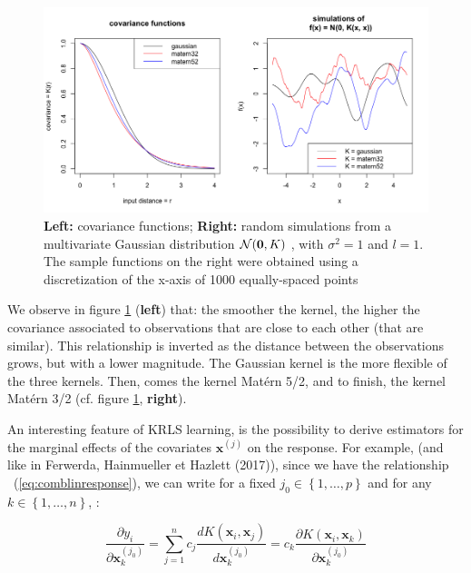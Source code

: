 \begin{figure}[!htb]
\centering
\includegraphics[width=14cm]{gfx/chapter-krls-models/covariance_functions.png}
\caption{\textbf{Left:} covariance functions; \textbf{Right:} random simulations from a multivariate Gaussian distribution $\mathcal{N}(\textbf{0}, K)$ , with $\sigma^2 = 1$ and $l = 1$. The sample functions on the right were obtained using a discretization of the x-axis of 1000 equally-spaced points}
\label{cov_functions}
\end{figure}

We observe in figure \ref{cov_functions} (\textbf{left}) that: the smoother the kernel, the higher the covariance associated to observations that are close to each other (that are similar). This relationship is inverted as the distance between the observations grows, but with a lower magnitude. The Gaussian kernel is the more flexible of the three kernels. Then, comes the kernel Mat\'ern 5/2, and to finish, the kernel Mat\'ern 3/2 (cf. figure \ref{cov_functions}, \textbf{right}).

An interesting feature of KRLS learning, is the possibility to derive estimators for the  marginal effects of the covariates $\textbf{x}^{(j)}$ on the response. For example, (and like in Ferwerda, Hainmueller et Hazlett (2017)), since we have the relationship ~(\ref{eq:comblinresponse}), we can write for a fixed $j_0 \in \left \lbrace 1, \ldots, p \right \rbrace$ and for any $k \in \left \lbrace 1, \ldots, n \right \rbrace $, :

\begin{equation}
\frac{\partial y_i}{\partial \textbf{x}_k^{(j_0)}} = \sum_{j = 1}^n c_j \frac{d K(\textbf{x}_i, \textbf{x}_j)}{d \textbf{x}_k^{(j_0)}} = c_k \frac{\partial K(\textbf{x}_i, \textbf{x}_k)}{\partial \textbf{x}_k^{(j_0)}}
\end{equation}

